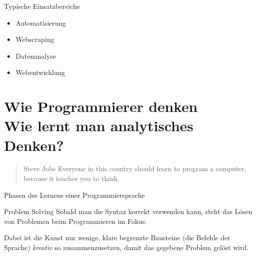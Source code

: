 \begin{frame}
	\begin{block}{Typische Einsatzbereiche}
		\begin{itemize}
			\item Automatisierung
			\item Webscraping
			\item Datenanalyse
			\item Webentwicklung
		\end{itemize}
	\end{block}
\end{frame}





\section{Wie Programmierer denken \\ \footnotesize{Wie lernt man analytisches Denken?}}

\begin{frame}
\begin{quote}{Steve Jobs}
	Everyone in this country should learn to program a computer, because it teaches you to think.
\end{quote}
\end{frame}


\begin{frame}
\begin{block}{Phasen des Lernens einer Programmiersprache}
\vspace{2pt}
\end{block}
\end{frame}

\begin{frame}

\begin{block}{Problem Solving}
\vspace{2pt}
Sobald man die Syntax korrekt verwenden kann, steht das Lösen von Problemen beim Programmieren im Fokus.

\pause 

Dabei ist die Kunst nur wenige, klare begrenzte Bausteine (die Befehle der Sprache) \emph{kreativ} so zusammenzusetzen, damit das gegebene Problem gelöst wird. 
\end{block}
\end{frame}

